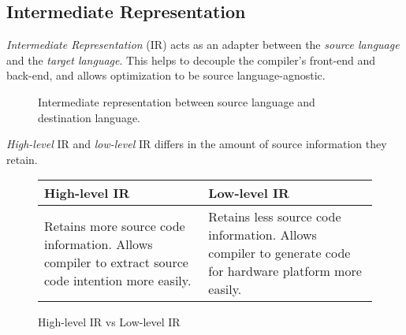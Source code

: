\subsection{Intermediate Representation}

\begin{definition}
    \textit{Intermediate Representation} (IR) acts as an adapter between the \textit{source language} and the \textit{target language}. This helps to decouple the compiler's front-end and back-end, and allows optimization to be source language-agnostic.
    
    \begin{figure}[H]
        \centering
        \caption{Intermediate representation between source language and destination language.}
        \label{fig:intermediate-representation}
    \end{figure}
\end{definition}

\begin{definition}
    \textit{High-level} IR and \textit{low-level} IR differs in the amount of source information they retain.
    \begin{figure}[H]
        \centering
        \begin{tabularx}{\textwidth}{@{} X X @{}}
            \toprule
            High-level IR & Low-level IR \\
            \midrule
            Retains more source code information. Allows compiler to extract source code intention more easily. & Retains less source code information. Allows compiler to generate code for hardware platform more easily. \\
            \bottomrule
        \end{tabularx}
        \caption{High-level IR vs Low-level IR}
        \label{fig:high-level-ir-vs-low-level-ir}
    \end{figure}
\end{definition}

